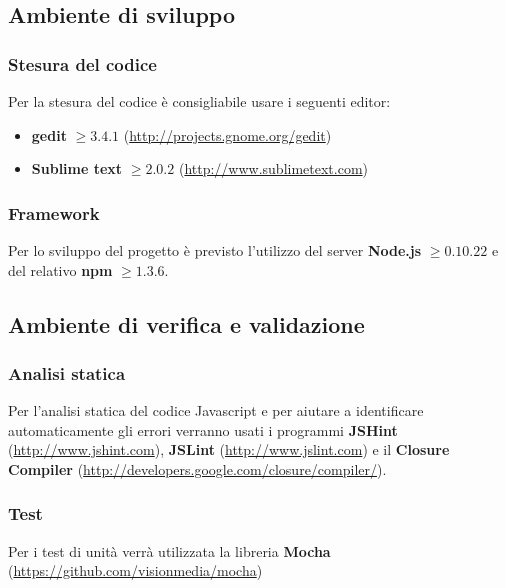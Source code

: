 	\subsection{Ambiente di sviluppo}
		
		\subsubsection{Stesura del codice}
		
		Per la stesura del codice è consigliabile usare i seguenti editor:
		\begin{itemize}
			\item \textbf{gedit} $\geq 3.4.1$ (\url{http://projects.gnome.org/gedit})
			\item \textbf{Sublime text} $\geq 2.0.2$ (\url{http://www.sublimetext.com})
		\end{itemize}
		
		\subsubsection{Framework}
		
		Per lo sviluppo del progetto è previsto l'utilizzo del server \textbf{Node.js} $\geq 0.10.22$ e del relativo  \textbf{npm} $\geq 1.3.6$.

	\subsection{Ambiente di verifica e validazione}
		\subsubsection{Analisi statica}
		
		Per l'analisi statica del codice Javascript e per aiutare a identificare automaticamente gli errori verranno usati i programmi \textbf{JSHint} (\url{http://www.jshint.com}), \textbf{JSLint} (\url{http://www.jslint.com}) e il \textbf{Closure Compiler} (\url{http://developers.google.com/closure/compiler/}).
		
		
		\subsubsection{Test}
		
		Per i test di unità verrà utilizzata la libreria \textbf{Mocha} (\url{https://github.com/visionmedia/mocha})
		
		
